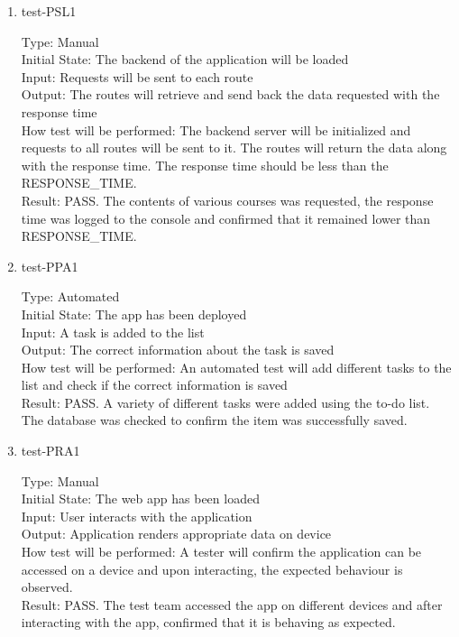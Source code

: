 \documentclass[12pt, titlepage]{article}
\begin{document}
\begin{enumerate}

\item{test-PSL1\\}

Type: Manual\\
Initial State: The backend of the application will be loaded\\
Input: Requests will be sent to each route\\
Output: The routes will retrieve and send back the data requested with the response time\\
How test will be performed: The backend server will be initialized and requests to all routes will be sent to it. The routes will return the data along with the response time. The response time should be less than the RESPONSE\_TIME.\\
Result: PASS. The contents of various courses was requested, the response time was logged to the console and confirmed that it remained lower than RESPONSE\_TIME. 

\item{test-PPA1\\}

Type: Automated\\
Initial State: The app has been deployed\\
Input: A task is added to the list\\
Output: The correct information about the task is saved\\
How test will be performed: An automated test will add different tasks to the list and check if the correct information is saved\\
Result: PASS. A variety of different tasks were added using the to-do list. The database was checked to confirm the item was successfully saved.

\item{test-PRA1\\}

Type: Manual\\
Initial State: The web app has been loaded\\
Input: User interacts with the application\\
Output: Application renders appropriate data on device\\
How test will be performed: A tester will confirm the application can be accessed on a device and upon interacting, the expected behaviour is observed. \\
Result: PASS. The test team accessed the app on different devices and after interacting with the app, confirmed that it is behaving as expected.


\end{enumerate}
\end{document}
